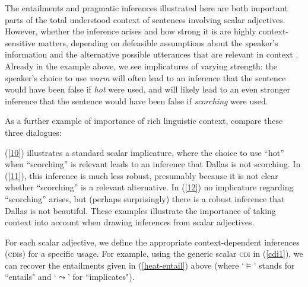 \documentclass[10pt]{article}
\begin{document}
 \vspace{-.05in}
The entailments and pragmatic inferences illustrated here are both important parts of the total understood context of sentences involving scalar adjectives. However, whether the inference arises and how strong it is are highly context-sensitive matters, depending on defeasible assumptions about the speaker's information and the alternative possible utterances that are relevant in context \cite{hirschberg1991theory,frank2012predicting,goodman2013knowledge}. Already in the example above, we see implicatures of varying strength: the speaker's choice to use \emph{warm} will often lead to an inference that the sentence would have been false if \emph{hot} were used, and will likely lead to an even stronger inference that the sentence would have been false if \emph{scorching} were used. 

As a further example of importance of rich linguistic context, compare these three dialogues: 
 \vspace{-.1in}
\begin{multicols}{3}
\end{multicols}
 \vspace{-.1in}
\noindent
(\ref{10}) illustrates a standard scalar implicature, where the choice to use ``hot'' when ``scorching'' is relevant leads to an inference that Dallas is not scorching. In (\ref{11}), this inference is much less robust, presumably because it is not clear whether ``scorching'' is a relevant alternative. In (\ref{12}) no implicature regarding ``scorching'' arises, but (perhaps surprisingly) there is a robust inference that Dallas is not beautiful. These examples illustrate the importance of taking context into account when drawing inferences from scalar adjectives. 

For each scalar adjective, we define the appropriate context-dependent inferences (\textsc{cdi}s) for a specific usage. 
For example, using the generic scalar \textsc{cdi} in (\ref{cdi1}), we can  recover the entailments given in (\ref{heat-entail}) above (where `$\vDash$' stands for ``entails" and `$\leadsto$'  for ``implicates"). 
\end{document}
